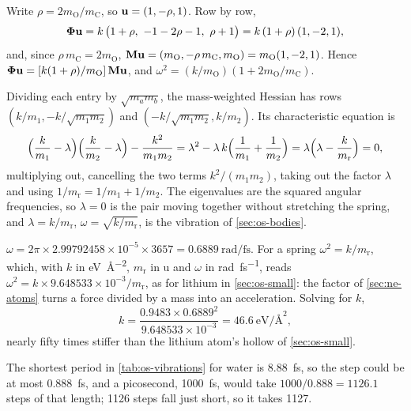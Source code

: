 Write $\rho = 2m_{\mathrm O}/m_{\mathrm C}$, so
$\bm{\mathrm{u}} = (1, -\rho, 1)$. Row by row,
\begin{equation*}
   \boldsymbol{\Phi}\bm{\mathrm{u}} = k\,\bigl(1 + \rho,\ -1 - 2\rho - 1,\ \rho + 1\bigr)
   = k\,(1 + \rho)\,(1, -2, 1) ,
\end{equation*}
and, since $\rho\,m_{\mathrm C} = 2m_{\mathrm O}$, $\bm{\mathrm{M}}\bm{\mathrm{u}} =
(m_{\mathrm O}, -\rho\,m_{\mathrm C}, m_{\mathrm O}) = m_{\mathrm O}(1, -2,
1)$. Hence $\boldsymbol{\Phi}\bm{\mathrm{u}} = [k(1 + \rho)/m_{\mathrm O}]\,\bm{\mathrm{M}}\bm{\mathrm{u}}$,
and $\omega^2 = (k/m_{\mathrm O})(1 + 2m_{\mathrm O}/m_{\mathrm C})$.

Dividing each entry by $\sqrt{m_am_b}$, the
mass-weighted Hessian has rows $(k/m_1, -k/\sqrt{m_1m_2})$ and
$(-k/\sqrt{m_1m_2}, k/m_2)$. Its characteristic equation is
\begin{equation*}
   \Bigl(\frac{k}{m_1} - \lambda\Bigr)\Bigl(\frac{k}{m_2} - \lambda\Bigr)
   - \frac{k^2}{m_1m_2} = \lambda^2 - \lambda\,k\Bigl(\frac{1}{m_1}
   + \frac{1}{m_2}\Bigr) = \lambda\Bigl(\lambda - \frac{k}{m_{\mathrm r}}\Bigr) = 0 ,
\end{equation*}
multiplying out, cancelling the two terms $k^2/(m_1m_2)$, taking out the
factor $\lambda$ and using $1/m_{\mathrm r} = 1/m_1 + 1/m_2$. The
eigenvalues are the squared angular frequencies, so $\lambda = 0$ is the
pair moving together without stretching the spring, and $\lambda =
k/m_{\mathrm r}$, $\omega = \sqrt{k/m_{\mathrm r}}$, is the vibration of
\cref{sec:os-bodies}.

$\omega = 2\pi\times2.99792458\times10^{-5}
\times3657 = \SI{0.6889}{\radian\per\femto\second}$. For a spring
$\omega^2 = k/m_{\mathrm r}$, which, with $k$ in
\si{\electronvolt\per\angstrom\squared}, $m_{\mathrm r}$ in \si{\amu} and
$\omega$ in \si{\radian\per\femto\second}, reads $\omega^2 =
k\times9.648533\times10^{-3}/m_{\mathrm r}$, as for lithium in
\cref{sec:os-small}: the factor of \cref{sec:ne-atoms} turns a force
divided by a mass into an acceleration. Solving for $k$,
\begin{equation*}
   k = \frac{0.9483\times0.6889^2}{9.648533\times10^{-3}}
   = \SI{46.6}{\electronvolt\per\angstrom\squared} ,
\end{equation*}
nearly fifty times stiffer than the lithium atom's hollow of
\cref{sec:os-small}.

The shortest period in \cref{tab:os-vibrations} for
water is \SI{8.88}{\femto\second}, so the step could be at most
\SI{0.888}{\femto\second}, and a picosecond, \SI{1000}{\femto\second},
would take $1000/0.888 = 1126.1$ steps of that length; 1126 steps fall
just short, so it takes 1127.
